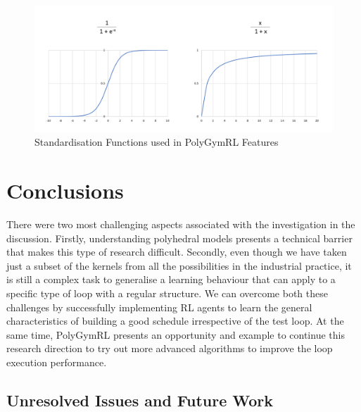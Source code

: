 \documentclass[logo,msc]{infthesis}           %
\begin{document}
\begin{figure}[htbp]
  \centering
  \includegraphics[width=\textwidth]{Images/Standardisation.png}    
  \caption{Standardisation Functions used in PolyGymRL Features}
  \label{fig:Standardisation}
\end{figure}


\chapter{Conclusions}

There were two most challenging aspects associated with the investigation in the discussion. Firstly, understanding polyhedral models presents a technical barrier that makes this type of research difficult. Secondly, even though we have taken just a subset of the kernels from all the possibilities in the industrial practice, it is still a complex task to generalise a learning behaviour that can apply to a specific type of loop with a regular structure. We can overcome both these challenges by successfully implementing RL agents to learn the general characteristics of building a good schedule irrespective of the test loop. At the same time, PolyGymRL presents an opportunity and example to continue this research direction to try out more advanced algorithms to improve the loop execution performance.

\section{Unresolved Issues and Future Work}
\end{document}
